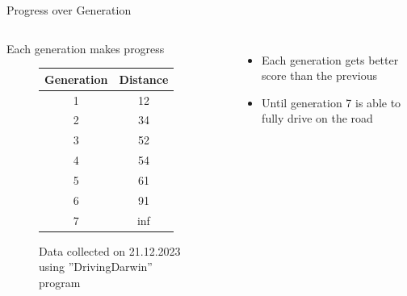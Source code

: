 \documentclass{do}
\begin{document}
\begin{frame}{Progress over Generation}
    \begin{columns}
        \column{.6\textheight}
        \begin{exampleblock}{Each generation makes progress}
            \centering
         \begin{figure}
            
            \begin{tabular}{c | c}
                Generation & Distance \\
                \hline
                1  & 12\\
                \hline
                2  & 34\\
                \hline
                3  & 52\\
                \hline
                4  & 54\\
                \hline
                5 & 61\\
                \hline
                6 & 91\\
                \hline
                7 & inf\\
            \end{tabular}
        \caption{\tiny{Data collected on 21.12.2023 using ”DrivingDarwin” program}}
        \end{figure}
        \end{exampleblock}
        \column{.4\textheight}
        \begin{itemize}
            \item \footnotesize{Each generation gets better score than the previous}
            \item \footnotesize{Until generation 7 is able to fully drive on the road}
        \end{itemize}
        
  
        
    \end{columns}
\end{frame}
\end{document}

